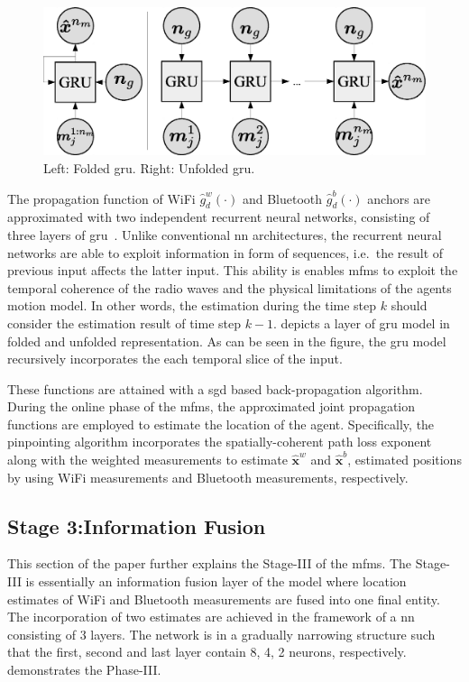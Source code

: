     \begin{figure}[thpb]
       \centering
       \includegraphics[width=0.9\linewidth]{figures/gru.eps}
       \caption{\label{fig:gru}Left: Folded \gls{gru}. Right: Unfolded \gls{gru}.}
    \end{figure}

    The propagation function of WiFi $\hat{g}^w_d(\cdot)$ and Bluetooth $\hat{g}^b_d(\cdot)$ anchors are approximated with two independent recurrent neural networks, consisting of three layers of \gls{gru}~\cite{cho2014learning}.
    Unlike conventional \gls{nn} architectures, the recurrent neural networks are able to exploit information in form of sequences, i.e.\ the result of previous input affects the latter input.
    This ability is enables \gls{mfms} to exploit the temporal coherence of the radio waves and the physical limitations of the agents motion model.
    In other words, the estimation during the time step $k$ should consider the estimation result of time step $k-1$.
     depicts a layer of \gls{gru} model in folded and unfolded representation.
    As can be seen in the figure, the \gls{gru} model recursively incorporates the each temporal slice of the input.

    These functions are attained with a \gls{sgd} based back-propagation algorithm.
    During the online phase of the \gls{mfms}, the approximated joint propagation functions are employed to estimate the location of the agent.
    Specifically, the pinpointing algorithm incorporates the spatially-coherent path loss exponent along with the weighted measurements to estimate $\bm{\hat{x}}^w$ and $\bm{\hat{x}}^b$, estimated positions by using WiFi measurements and Bluetooth measurements, respectively.



    \subsection{Stage 3:Information Fusion}
    This section of the paper further explains the Stage-III of the \gls{mfms}.
    The Stage-III is essentially an information fusion layer of the model where location estimates of WiFi and Bluetooth measurements are fused into one final entity.
    The incorporation of two estimates are achieved in the framework of a \gls{nn} consisting of 3 layers.
    The network is in a gradually narrowing structure such that the first, second and last layer contain 8, 4, 2 neurons, respectively.
     demonstrates the Phase-III\@.

